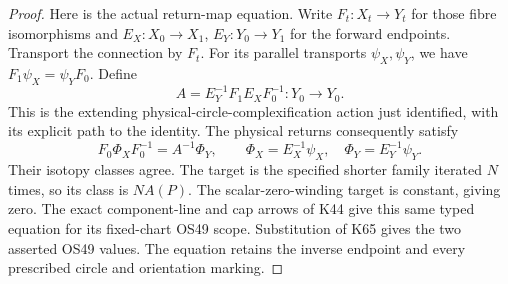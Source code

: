 \begin{proof}
Here is the actual return-map equation. Write
\(F_t:X_t\to Y_t\) for those fibre isomorphisms and
\(E_X:X_0\to X_1\), \(E_Y:Y_0\to Y_1\) for the
forward endpoints. Transport the connection by \(F_t\).
For its parallel transports \(\psi_X,\psi_Y\), we have
\(F_1\psi_X=\psi_YF_0\). Define
\[
 A=E_Y^{-1}F_1E_XF_0^{-1}:Y_0\longrightarrow Y_0.
\]
This is the extending physical-circle-complexification
action just identified, with its explicit path to the
identity. The physical returns consequently satisfy
\[
 F_0\Phi_XF_0^{-1}=A^{-1}\Phi_Y,
 \qquad \Phi_X=E_X^{-1}\psi_X,\quad
 \Phi_Y=E_Y^{-1}\psi_Y.
\]
Their isotopy classes agree. The target is the specified
shorter family iterated \(N\) times, so its class is
\(N A(P)\). The scalar-zero-winding target is constant,
giving zero. The exact component-line and cap arrows of
K44 give this same typed equation for its fixed-chart
OS49 scope. Substitution of K65 gives the two asserted
OS49 values. The equation retains the inverse endpoint
and every prescribed circle and orientation marking.
\end{proof}
